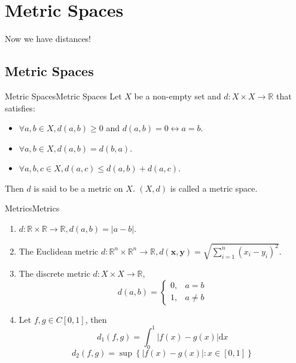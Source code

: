 \documentclass[../main.tex]{subfiles}
\begin{document}
\chapter{Metric Spaces}

Now we have distances!

\section{Metric Spaces}
\begin{definition}{Metric Spaces}{Metric Spaces}
Let $X$ be a non-empty set and $d: X \times X \rightarrow  \mathbb{R}$ that satisfies:
\begin{itemize}
\item $\forall a,b\in X, d(a,b)\geq 0$ and $d(a,b)=0 \leftrightarrow a=b$.
\item $\forall a,b\in X,d(a,b) = d(b,a)$.
\item $\forall a,b,c\in X, d(a,c) \leq d(a,b)+d(a,c)$.
\end{itemize}
Then $d$ is said to be a metric on $X$. $(X,d)$ is called a metric space.
\end{definition}

\begin{example}{Metrics}{Metrics}
\begin{enumerate}
	\item $d: \mathbb{R} \times \mathbb{R}\rightarrow \mathbb{R}, d(a,b) = \left|a-b\right|$.
	\item The Euclidean metric $\displaystyle d: \mathbb{R}^n \times \mathbb{R}^n \rightarrow  \mathbb{R}, d(\boldsymbol{x},\boldsymbol{y}) = \sqrt{\sum_{i=1}^{n} (x_i-y_i)^2}$.
	\item The discrete metric $d: X \times X \rightarrow \mathbb{R}$,
		\begin{equation*}
		d(a,b) = 
		\begin{cases}
			0, & a=b\\
			1, & a\neq b
		\end{cases}
		\end{equation*}
	\item Let $f,g\in C[0,1]$, then
		\begin{equation*}
		d_1(f,g) = \int _0^1 \left|f(x)-g(x)\right| \mathrm{d}x
		\end{equation*}
		\begin{equation*}
			d_2(f,g) = \sup \left\{ \left|f(x)-g(x)\right|: x\in [0,1] \right\}
		\end{equation*}
\end{enumerate}
\end{example}
\end{document}

